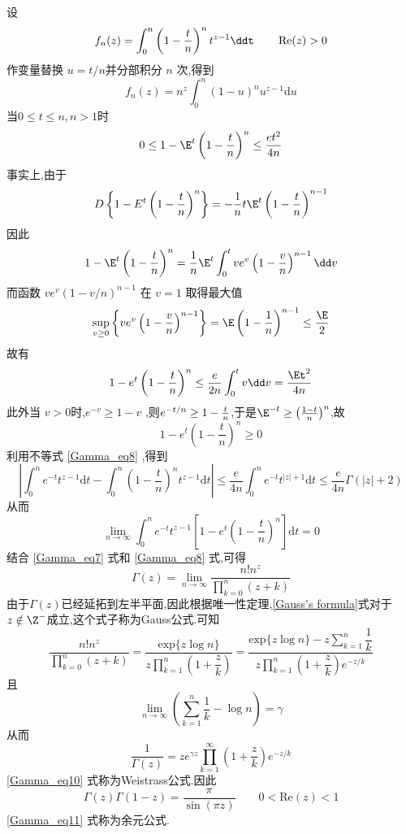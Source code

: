 	设
	\begin{equation}
		f_{n}(z)=\int_{0}^{n}\left(1-\frac{t}{n}\right)^{n}t^{z-1}\ddt
    \qquad\operatorname{Re}(z)>0
	\end{equation}
	作变量替换 $u=t/n $并分部积分 $n$ 次,得到
	\begin{equation}\label{Gamma_eq7}
		f_{n}(z)=n^{z}\int_{0}^{n}(1-u)^{n}u^{z-1}\mathrm{d}u 
	\end{equation}
	当$0\leq t\leq n,n>1$时
	\begin{equation}\label{Gamma_eq8}
		0\leq 1-\E^{t}\left(1-\frac{t}{n}\right)^{n}\leq\frac{et^2}{4n}
	\end{equation}
	事实上,由于
	\[
		D\left\{1-E^{t}\left(1-\frac{t}{n}\right)^{n}\right\}=-\frac{1}{n}t\E^{t}\left(1-\frac{t}{n}\right)^{n-1}
	\]
	因此
	\[
		1-\E^{t}\left(1-\frac{t}{n}\right)^{n}
    =\frac{1}{n}\E^{t}\int_{0}^{t}ve^{v}\left(1-\frac{v}{n}\right)^{n-1}\dd v
	\]
	而函数 $ve^{v}(1-v/n)^{n-1}$ 在 $v=1$ 取得最大值
	\[
		\sup_{v\geq 0}\left\{ve^{v}\left(1-\frac{v}{n}\right)^{n-1}\right\}
    =\E\left(1-\frac{1}{n}\right)^{n-1}\leq \frac{\E}{2}
	\]
	故有
	\[
		1-e^{t}\left(1-\frac{t}{n}\right)^{n} \leq \frac{e}{2n}\int_{0}^{t}v\dd v
    =\frac{\Et^2}{4n}
	\]
	此外当 $v>0$时,$e^{-v}\geqslant1-v$ ,则$e^{-t/n}\geq 1-{t \over n}$,于是$\E^{-t}\geq\left(1-t \over n\right)^{n}$,故
	\[
		1-e^{t}\left(1-\frac{t}{n}\right)^{n}\geq 0
	\]
	利用不等式 \autoref{Gamma_eq8} ,得到
	\[
		\left|\int_{0}^{n}e^{-t}t^{z-1}\mathrm{d}t-\int_{0}^{n}\left(1-\frac{t}{n}\right)^{n}t^{z-1}\mathrm{d}t\right|
		\leqslant\frac{e}{4n}\int_{0}^{n}e^{-t}t^{|z|+1}\mathrm{d}t\leqslant\frac{e}{4n}\Gamma(|z|+2)
	\]
	从而
	\[
		\lim_{n\to\infty}\int_{0}^{n}e^{-t}t^{z-1}\left[1-e^{t}\left(1-\frac{t}{n}\right)^{n}\right]\mathrm{d}t=0
	\]
	结合 \autoref{Gamma_eq7} 式和 \autoref{Gamma_eq8} 式,可得
	\begin{equation}\label{Gamma_eq9}
		\Gamma(z)=\lim_{n\to\infty}\frac{n!n^{z}}{\displaystyle{\prod_{k=0}^{n}(z+k)}}
	\end{equation}
	由于$\Gamma(z)$已经延拓到左半平面,因此根据唯一性定理,\eqref{Gauss's formula}式对于$z\notin{\Z^{-}}$成立,这个式子称为Gauss公式.可知
	\[
		\frac{n!n^{z}}{\prod\limits_{k=0}^{n}(z+k)}
		=\frac{\mathrm{exp}\{z\log n\}}{z\prod\limits_{k=1}^{n}\left(1+\dfrac{z}{k}\right)}
		=\frac{\mathrm{exp}\{z\log n\}-z\sum\limits_{k=1}^{n}\dfrac{1}{k}}{z\prod\limits_{k=1}^{n}\left(1+\dfrac{z}{k}\right)e^{-z/k}}
	\]
	且
	\begin{equation}
		\lim_{n\to\infty}\left(\sum_{k=1}^{n}\frac{1}{k}-\log n\right)=\gamma
	\end{equation}
	从而
	\begin{equation}\label{Gamma_eq10}
		\frac{1}{\Gamma(z)}=ze^{\gamma z}\prod_{k=1}^{\infty}\left(1+\frac{z}{k}\right)e^{-z/k}
	\end{equation}
	\autoref{Gamma_eq10} 式称为Weistrass公式.因此
	\begin{equation}\label{Gamma_eq11}
		\Gamma(z)\Gamma(1-z)=\frac{\pi}{\sin(\pi z)}\qquad 0<\mathrm{Re}(z)<1
	\end{equation}
	\autoref{Gamma_eq11} 式称为余元公式.
